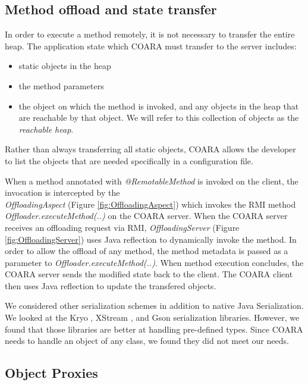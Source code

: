 \documentclass[10pt,journal,cspaper,compsoc]{IEEEtran}
\begin{document}
\subsection{Method offload and state transfer \label{section.serialization}}


In order to execute a method remotely, it is not necessary to transfer the entire heap.  The application state which COARA must transfer to the server includes:
\begin{itemize}
 \item static objects in the heap
 \item the method parameters
 \item the object on which the method is invoked, and any objects in the heap that are reachable by that object.  We will refer to this collection of objects as the \emph{reachable heap}.

 \end{itemize}
 Rather than always transferring all static objects, COARA allows the developer to list the objects that are needed specifically in a configuration file.

When a method annotated with \emph{@RemotableMethod} is invoked on the client, the invocation is intercepted by the \\\emph{OffloadingAspect} (Figure \ref{fig:OffloadingAspect}) which invokes the RMI method \\\emph{Offloader.executeMethod(..)} on the COARA server.   When the COARA server receives an offloading request via RMI, \emph{OffloadingServer} (Figure \ref{fig:OffloadingServer}) uses Java reflection to dynamically invoke the method.  In order to allow the offload of any method, the method metadata is passed as a parameter to \emph{Offloader.executeMethod(..)}.  When method execution concludes, the COARA server sends the modified state back to the client.  The COARA client then uses Java reflection to update the transfered objects.

We considered other serialization schemes in addition to native Java Serialization.  We looked at the Kryo \cite{kryo:Online}, XStream \cite{xstream:Online}, and Gson \cite{gson:Online} serialization libraries.  However, we found that those libraries are better at handling pre-defined types.  Since COARA needs to handle an object of any class, we found they did not meet our needs.


\subsection{Object Proxies \label{section.object_proxies}}
\end{document}
